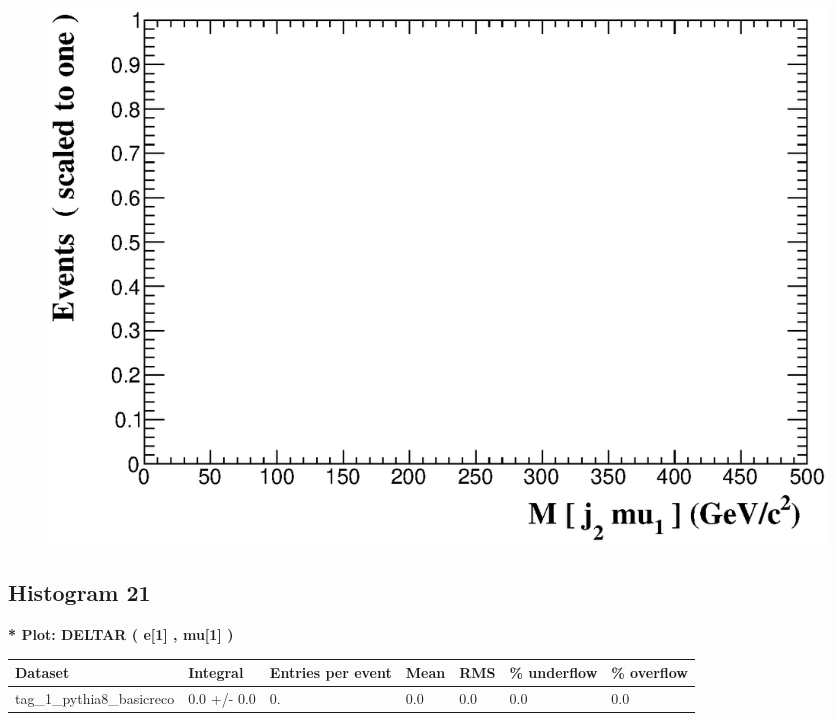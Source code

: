 \documentclass[a4paper, 10pt]{article}
\begin{document}
\begin{figure}[H]
  \begin{center}
    \includegraphics[scale=0.45]{selection_19.eps}\\
\caption{   }
  \end{center}
\end{figure}
      \newpage
\subsection{ Histogram 21}

\textbf{* Plot: DELTAR ( e[1] , mu[1] ) }\\
   \begin{table}[H]
  \begin{center}
    \begin{tabular}{|m{23.0mm}|m{23.0mm}|m{18.0mm}|m{19.0mm}|m{19.0mm}|m{19.0mm}|m{19.0mm}|}
      \hline
      {\cellcolor{yellow}         Dataset}& {\cellcolor{yellow}         Integral}& {\cellcolor{yellow}         Entries per event}& {\cellcolor{yellow}         Mean}& {\cellcolor{yellow}         RMS}& {\cellcolor{yellow}         \% underflow}& {\cellcolor{yellow}         \% overflow}\\
      \hline
      {\cellcolor{white}         tag\_1\_pythia8\_basicreco}& {\cellcolor{white}         0.0 +/\-- 0.0}& {\cellcolor{white}         0.}& {\cellcolor{white}         0.0}& {\cellcolor{white}         0.0}& {\cellcolor{green}         0.0}& {\cellcolor{green}         0.0}\\
\hline
    \end{tabular}
  \end{center}
\end{table}
\end{document}

